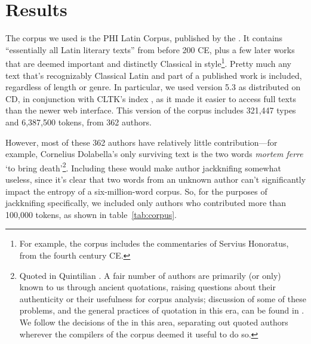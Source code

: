 \documentclass[12pt,twoside]{article}
\begin{document}
\section{Results}
\label{sec:res}

The corpus we used is the PHI Latin Corpus, published by the \citet{phi}. It contains ``essentially all Latin literary texts'' from before 200 CE, plus a few later works that are deemed important and distinctly Classical in style\footnote{For example, the corpus includes the commentaries of Servius Honoratus, from the fourth century CE.}. Pretty much any text that's recognizably Classical Latin and part of a published work is included, regardless of length or genre. In particular, we used version 5.3 as distributed on CD, in conjunction with CLTK's index \citep{cltk}, as it made it easier to access full texts than the newer web interface. This version of the corpus includes 321,447 types and 6,387,500 tokens, from 362 authors.

However, most of these 362 authors have relatively little contribution---for example, Cornelius Dolabella's only surviving text is the two words \emph{mortem ferre} `to bring death'\footnote{Quoted in Quintilian \citep[VIII.2.4]{quintilian}. A fair number of authors are primarily (or only) known to us through ancient quotations, raising questions about their authenticity or their usefulness for corpus analysis; discussion of some of these problems, and the general practices of quotation in this era, can be found in \citet{vandenhoek}. We follow the decisions of the \citeauthor{phi} in this area, separating out quoted authors wherever the compilers of the corpus deemed it useful to do so.}. Including these would make author jackknifing somewhat useless, since it's clear that two words from an unknown author can't significantly impact the entropy of a six-million-word corpus. So, for the purposes of jackknifing specifically, we included only authors who contributed more than 100,000 tokens, as shown in table~\ref{tab:corpus}.
\end{document}
